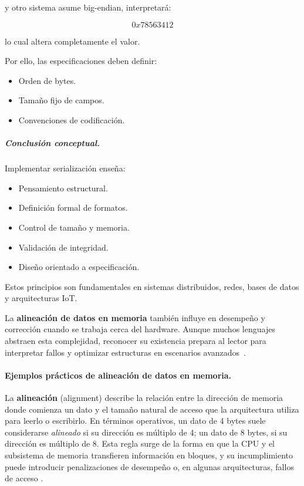\documentclass[12pt,twoside]{book}
\begin{document}
						y otro sistema asume big-endian, interpretará:
						
						\[
						0x78563412
						\]
						
						lo cual altera completamente el valor.
						
						Por ello, las especificaciones deben definir:
						
						\begin{itemize}
							\item Orden de bytes.
							\item Tamaño fijo de campos.
							\item Convenciones de codificación.
						\end{itemize}
						
						\subparagraph{Conclusión conceptual.} Implementar serialización enseña:
						
						\begin{itemize}
							\item Pensamiento estructural.
							\item Definición formal de formatos.
							\item Control de tamaño y memoria.
							\item Validación de integridad.
							\item Diseño orientado a especificación.
						\end{itemize}
						
						Estos principios son fundamentales en sistemas distribuidos, redes, bases de datos y arquitecturas IoT.
						
						La \textbf{alineación de datos en memoria} también influye en desempeño y corrección cuando se trabaja cerca del hardware. Aunque muchos lenguajes abstraen esta complejidad, reconocer su existencia prepara al lector para interpretar fallos y optimizar estructuras en escenarios avanzados~\cite{Tanenbaum2021Structured,Sebesta2018Concepts,Silberschatz2018Operating}.
						
						\paragraph{Ejemplos prácticos de alineación de datos en memoria.}
						La \textbf{alineación} (alignment) describe la relación entre la dirección de memoria donde comienza un dato y el tamaño natural de acceso que la arquitectura utiliza para leerlo o escribirlo. En términos operativos, un dato de 4 bytes suele considerarse \emph{alineado} si su dirección es múltiplo de 4; un dato de 8 bytes, si su dirección es múltiplo de 8. Esta regla surge de la forma en que la CPU y el subsistema de memoria transfieren información en bloques, y su incumplimiento puede introducir penalizaciones de desempeño o, en algunas arquitecturas, fallos de acceso \cite{Tanenbaum2021Structured,Silberschatz2018Operating,Sebesta2018Concepts}.
						
\end{document}
